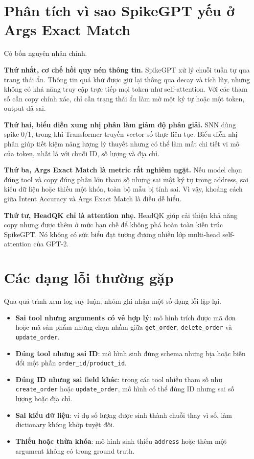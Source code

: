 \documentclass[12pt,a4paper,oneside]{report}
\newlength{\manualparindent}
\newcommand{\manualindent}{\hspace*{\manualparindent}}
\begin{document}
\section{Phân tích vì sao SpikeGPT yếu ở Args Exact Match}

\manualindent%
Có bốn nguyên nhân chính.

\manualindent%
\textbf{Thứ nhất, cơ chế hồi quy nén thông tin.} SpikeGPT xử lý chuỗi tuần tự qua trạng thái ẩn. Thông tin quá khứ được giữ lại thông qua decay và tích lũy, nhưng không có khả năng truy cập trực tiếp mọi token như self-attention. Với các tham số cần copy chính xác, chỉ cần trạng thái ẩn làm mờ một ký tự hoặc một token, output đã sai.

\manualindent%
\textbf{Thứ hai, biểu diễn xung nhị phân làm giảm độ phân giải.} SNN dùng spike 0/1, trong khi Transformer truyền vector số thực liên tục. Biểu diễn nhị phân giúp tiết kiệm năng lượng lý thuyết nhưng có thể làm mất chi tiết vi mô của token, nhất là với chuỗi ID, số lượng và địa chỉ.

\manualindent%
\textbf{Thứ ba, Args Exact Match là metric rất nghiêm ngặt.} Nếu model chọn đúng tool và copy đúng phần lớn tham số nhưng sai một ký tự trong address, sai kiểu dữ liệu hoặc thiếu một khóa, toàn bộ mẫu bị tính sai. Vì vậy, khoảng cách giữa Intent Accuracy và Args Exact Match là điều dễ hiểu.

\manualindent%
\textbf{Thứ tư, HeadQK chỉ là attention nhẹ.} HeadQK giúp cải thiện khả năng copy nhưng được thêm ở mức hạn chế để không phá hoàn toàn kiến trúc SpikeGPT. Nó không có sức biểu đạt tương đương nhiều lớp multi-head self-attention của GPT-2.

\section{Các dạng lỗi thường gặp}

\manualindent%
Qua quá trình xem log suy luận, nhóm ghi nhận một số dạng lỗi lặp lại.

\begin{itemize}
  \item \textbf{Sai tool nhưng arguments có vẻ hợp lý}: mô hình trích được mã đơn hoặc mã sản phẩm nhưng chọn nhầm giữa \texttt{get\_order}, \texttt{delete\_order} và \texttt{update\_order}.
  \item \textbf{Đúng tool nhưng sai ID}: mô hình sinh đúng schema nhưng bịa hoặc biến đổi một phần \texttt{order\_id}/\texttt{product\_id}.
  \item \textbf{Đúng ID nhưng sai field khác}: trong các tool nhiều tham số như \texttt{create\_order} hoặc \texttt{update\_order}, mô hình có thể đúng ID nhưng sai số lượng hoặc địa chỉ.
  \item \textbf{Sai kiểu dữ liệu}: ví dụ số lượng được sinh thành chuỗi thay vì số, làm dictionary không khớp tuyệt đối.
  \item \textbf{Thiếu hoặc thừa khóa}: mô hình sinh thiếu \texttt{address} hoặc thêm một argument không có trong ground truth.
\end{itemize}
\end{document}
